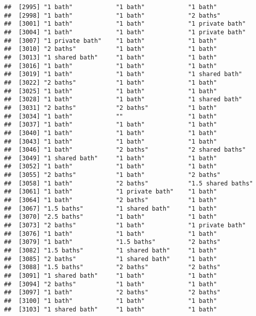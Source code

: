 \documentclass[
]{article}
\begin{document}
\begin{verbatim}
##  [2995] "1 bath"            "1 bath"            "1 bath"           
##  [2998] "1 bath"            "1 bath"            "2 baths"          
##  [3001] "1 bath"            "1 bath"            "1 private bath"   
##  [3004] "1 bath"            "1 bath"            "1 private bath"   
##  [3007] "1 private bath"    "1 bath"            "1 bath"           
##  [3010] "2 baths"           "1 bath"            "1 bath"           
##  [3013] "1 shared bath"     "1 bath"            "1 bath"           
##  [3016] "1 bath"            "1 bath"            "1 bath"           
##  [3019] "1 bath"            "1 bath"            "1 shared bath"    
##  [3022] "2 baths"           "1 bath"            "1 bath"           
##  [3025] "1 bath"            "1 bath"            "1 bath"           
##  [3028] "1 bath"            "1 bath"            "1 shared bath"    
##  [3031] "2 baths"           "2 baths"           "1 bath"           
##  [3034] "1 bath"            ""                  "1 bath"           
##  [3037] "1 bath"            "1 bath"            "1 bath"           
##  [3040] "1 bath"            "1 bath"            "1 bath"           
##  [3043] "1 bath"            "1 bath"            "1 bath"           
##  [3046] "1 bath"            "2 baths"           "2 shared baths"   
##  [3049] "1 shared bath"     "1 bath"            "1 bath"           
##  [3052] "1 bath"            "1 bath"            "1 bath"           
##  [3055] "2 baths"           "1 bath"            "2 baths"          
##  [3058] "1 bath"            "2 baths"           "1.5 shared baths" 
##  [3061] "1 bath"            "1 private bath"    "1 bath"           
##  [3064] "1 bath"            "2 baths"           "1 bath"           
##  [3067] "1.5 baths"         "1 shared bath"     "1 bath"           
##  [3070] "2.5 baths"         "1 bath"            "1 bath"           
##  [3073] "2 baths"           "1 bath"            "1 private bath"   
##  [3076] "1 bath"            "1 bath"            "1 bath"           
##  [3079] "1 bath"            "1.5 baths"         "2 baths"          
##  [3082] "1.5 baths"         "1 shared bath"     "1 bath"           
##  [3085] "2 baths"           "1 shared bath"     "1 bath"           
##  [3088] "1.5 baths"         "2 baths"           "2 baths"          
##  [3091] "1 shared bath"     "1 bath"            "1 bath"           
##  [3094] "2 baths"           "1 bath"            "1 bath"           
##  [3097] "1 bath"            "2 baths"           "2 baths"          
##  [3100] "1 bath"            "1 bath"            "1 bath"           
##  [3103] "1 shared bath"     "1 bath"            "1 bath"           

\end{verbatim}
\end{document}
